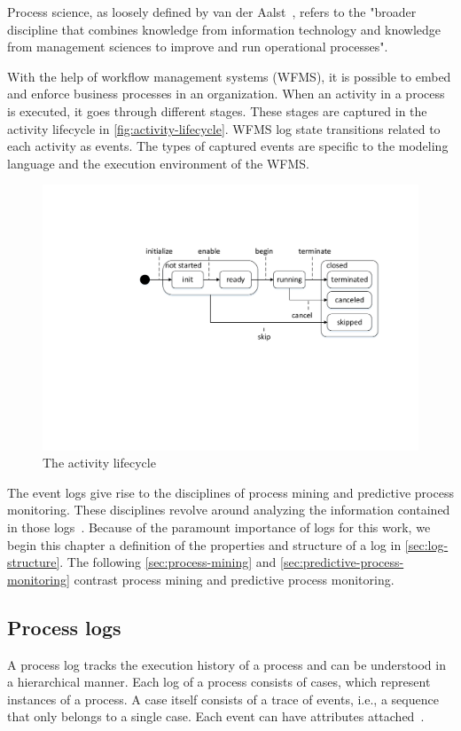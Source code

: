 Process science, as loosely defined by van der Aalst~\cite{Aalst2016}, refers to the "broader discipline that combines knowledge from information technology and knowledge from management sciences to improve and run operational processes".

With the help of workflow management systems (WFMS), it is possible to embed and enforce business processes in an organization. When an activity in a process is executed, it goes through different stages. These stages are captured in the activity lifecycle in \autoref{fig:activity-lifecycle}. WFMS log state transitions related to each activity as events. The types of captured events are specific to the modeling language and the execution environment of the WFMS.

\begin{figure}[!htb]
    \centering
    \includegraphics[width=.9\textwidth]{gfx/activityLifeCycle.pdf}
    \caption{The activity lifecycle}
    \label{fig:activity-lifecycle}
\end{figure}

The event logs give rise to the disciplines of process mining and predictive process monitoring. These disciplines revolve around analyzing the information contained in those logs~\cite{Aalst2016}. Because of the paramount importance of logs for this work, we begin this chapter a definition of the properties and structure of a log in \autoref{sec:log-structure}. The following \autoref{sec:process-mining} and \autoref{sec:predictive-process-monitoring} contrast process mining and predictive process monitoring.

\subsection{Process logs}\label{sec:log-structure}
A process log tracks the execution history of a process and can be understood in a hierarchical manner. Each log of a process consists of cases, which represent instances of a process. A case itself consists of a trace of events, i.e., a sequence that only belongs to a single case. Each event can have attributes attached~\cite{Aalst2016}.

